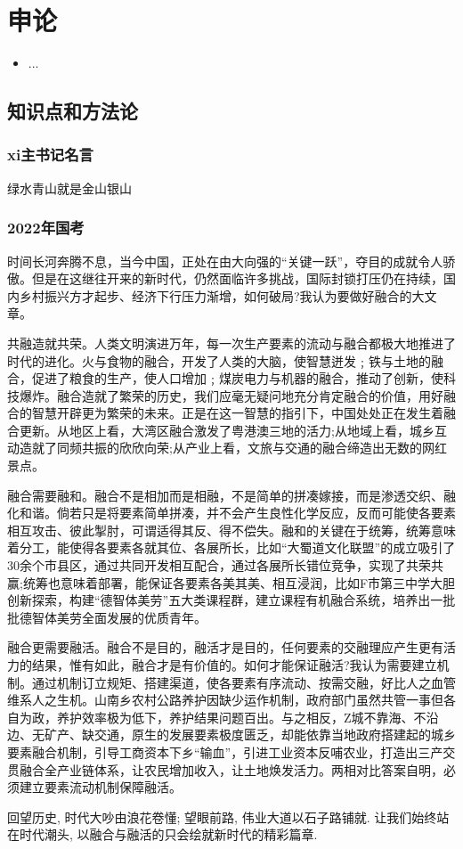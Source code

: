 \chapter{申论}
\label{chap1}
\begin{itemize}[noitemsep,topsep=0pt,parsep=0pt,partopsep=0pt]
	\item ...
\end{itemize}

\section{知识点和方法论}

\subsection{xi主书记名言}

绿水青山就是金山银山


\subsection{2022年国考}
时间长河奔腾不息，当今中国，正处在由大向强的“关键一跃”，夺目的成就令人骄傲。但是在这继往开来的新时代，仍然面临许多挑战，国际封锁打压仍在持续，国内乡村振兴方才起步、经济下行压力渐增，如何破局?我认为要做好融合的大文章。

共融造就共荣。人类文明演进万年，每一次生产要素的流动与融合都极大地推进了时代的进化。火与食物的融合，开发了人类的大脑，使智慧迸发﹔铁与土地的融合，促进了粮食的生产，使人口增加﹔煤炭电力与机器的融合，推动了创新，使科技爆炸。融合造就了繁荣的历史，我们应毫无疑问地充分肯定融合的价值，用好融合的智慧开辟更为繁荣的未来。正是在这一智慧的指引下，中国处处正在发生着融合更新。从地区上看，大湾区融合激发了粤港澳三地的活力;从地域上看，城乡互动造就了同频共振的欣欣向荣;从产业上看，文旅与交通的融合缔造出无数的网红景点。


融合需要融和。融合不是相加而是相融，不是简单的拼凑嫁接，而是渗透交织、融化和谐。倘若只是将要素简单拼凑，并不会产生良性化学反应，反而可能使各要素相互攻击、彼此掣肘，可谓适得其反、得不偿失。融和的关键在于统筹，统筹意味着分工，能使得各要素各就其位、各展所长，比如“大蜀道文化联盟”的成立吸引了30余个市县区，通过共同开发相互配合，通过各展所长错位竞争，实现了共荣共赢;统筹也意味着部署，能保证各要素各美其美、相互浸润，比如F市第三中学大胆创新探索，构建“德智体美劳”五大类课程群，建立课程有机融合系统，培养出一批批德智体美劳全面发展的优质青年。

融合更需要融活。融合不是目的，融活才是目的，任何要素的交融理应产生更有活力的结果，惟有如此，融合才是有价值的。如何才能保证融活?我认为需要建立机制。通过机制订立规矩、搭建渠道，使各要素有序流动、按需交融，好比人之血管维系人之生机。山南乡农村公路养护因缺少运作机制，政府部门虽然共管一事但各自为政，养护效率极为低下，养护结果问题百出。与之相反，Z城不靠海、不沿边、无矿产、缺交通，原生的发展要素极度匮乏，却能依靠当地政府搭建起的城乡要素融合机制，引导工商资本下乡“输血”，引进工业资本反哺农业，打造出三产交贯融合全产业链体系，让农民增加收入，让土地焕发活力。两相对比答案自明，必须建立要素流动机制保障融活。


回望历史, 时代大吵由浪花卷懂; 望眼前路, 伟业大道以石子路铺就. 让我们始终站在时代潮头, 以融合与融活的只会绘就新时代的精彩篇章.